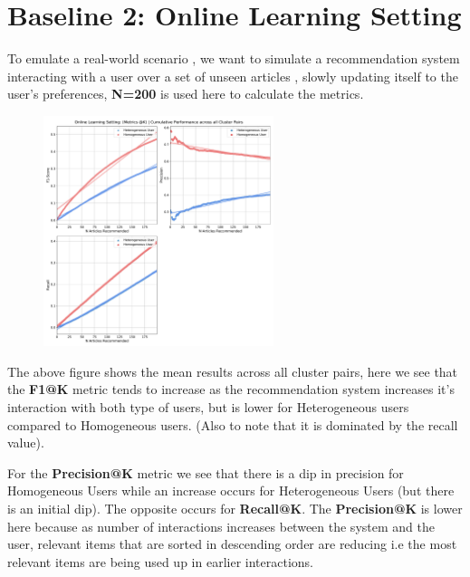 \documentclass[a4paper,fontsize=9.0pt]{scrartcl}
\begin{document}
\vspace{-1ex}
\section{Baseline 2: Online Learning Setting}
\begin{flushleft}
To emulate a real-world scenario , we want to simulate a recommendation system interacting with a user over a set of unseen articles , slowly updating itself to the user's preferences, \textbf{N=200} is used here to calculate the metrics.
\end{flushleft}
\vspace{-3ex}
\begin{figure}[H]
 \includegraphics[width=0.6\textwidth]{Graphs/user_interaction_vs_model_performance_cumu.pdf}
\end{figure}
\begin{flushleft}
The above figure shows the mean results across all cluster pairs, here we see that the \textbf{F1@K} metric tends to increase as the recommendation system increases it's interaction with both type of users, but is lower for Heterogeneous users compared to Homogeneous users. (Also to note that it is dominated by the recall value).
\end{flushleft}
\begin{flushleft}
For the \textbf{Precision@K} metric we see that there is a dip in precision for Homogeneous Users while an increase occurs for Heterogeneous Users (but there is an initial dip). The opposite occurs for \textbf{Recall@K}. The \textbf{Precision@K} is lower here because as number of interactions increases between the system and the user, relevant items that are sorted in descending order are reducing i.e the most relevant items are being used up in earlier interactions.
\end{flushleft}
\end{document}
